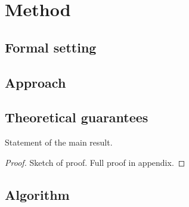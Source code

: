 \chapter{Method}
\label{chap:method}

\section{Formal setting}
\label{sec:method:setting}


\section{Approach}
\label{sec:method:approach}


\section{Theoretical guarantees}
\label{sec:method:theory}

\begin{theorem}
  \label{thm:main}
  Statement of the main result.
\end{theorem}

\begin{proof}
  Sketch of proof. Full proof in appendix.
\end{proof}

\section{Algorithm}
\label{sec:method:algorithm}

